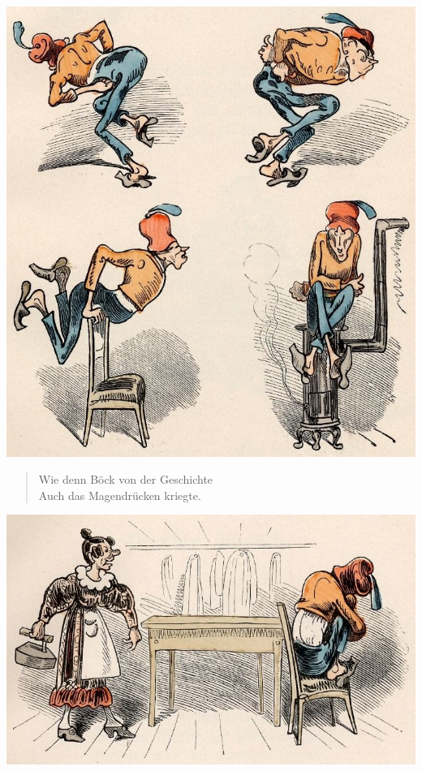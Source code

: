\documentclass[a4paper,12pt]{article}
\begin{document}
\begin{center}\includegraphics[scale=.7, alt={... und mit Magendrücken}]{images/3-11.jpg}\end{center}



\begin{verse}
Wie denn Böck von der Geschichte\\{}
Auch das Magendrücken kriegte.
\end{verse}



\begin{center}\includegraphics[scale=.7, alt={Frau Böck}]{images/3-12.jpg}\end{center}
\end{document}
